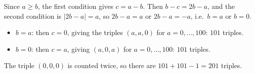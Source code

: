 Since $a\ge b$, the first condition gives $c=a-b$. Then $b-c=2b-a$, and the second condition is $|2b-a|=a$, so $2b-a=a$ or $2b-a=-a$, i.e.\ $b=a$ or $b=0$.
\begin{itemize}
\item $b=a$: then $c=0$, giving the triples $(a,a,0)$ for $a=0,\dots,100$: $101$ triples.
\item $b=0$: then $c=a$, giving $(a,0,a)$ for $a=0,\dots,100$: $101$ triples.
\end{itemize}
The triple $(0,0,0)$ is counted twice, so there are $101+101-1=\boxed{201}$ triples.
